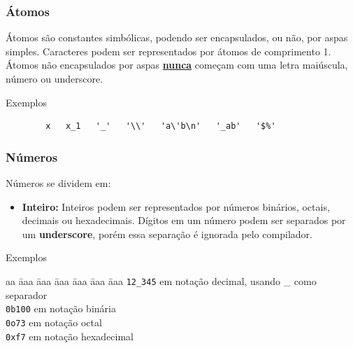 \begin{frame}[fragile]
	\frametitle{Átomos}
	
	Átomos são constantes simbólicas, podendo ser encapsulados, ou não, por 
	aspas simples. Caracteres podem ser representados por átomos de comprimento 1. Átomos 
	não encapsulados por aspas \underline{\textbf{nunca}} começam com uma letra maiúscula, número ou
	underscore.
	
	\begin{exampleblock}{Exemplos}
		\begin{verbatim}
		x   x_1   '_'   '\\'   'a\'b\n'   '_ab'   '$%'
		\end{verbatim}
	\end{exampleblock}
	
\end{frame}


\begin{frame}
	\frametitle{Números \textrm{\MakeUppercase{}}}
	
	Números se dividem em:
	
	\begin{itemize}
		
		\item \textbf{Inteiro:} Inteiros podem ser representados por números binários, octais,
		decimais ou hexadecimais. Dígitos em um número podem ser separados por um 
		\textbf{underscore}, porém essa separação é ignorada pelo compilador.
		
	\end{itemize}
	
	\begin{exampleblock}{Exemplos}
		\begin{tabbing}
			aa \= aaa \= aaa \= aaa \= aaa \= aaa \= aaa \kill
			\> \texttt{12\_345} \> \>  em notação decimal, usando \_ como separador \\
			\> \texttt{0b100} \> \>  em notação binária  \\
			\> \texttt{0o73} \> \>  em notação octal \\
			\> \texttt{0xf7} \> \>  em notação hexadecimal  
		\end{tabbing}
	\end{exampleblock}
	
\end{frame}


